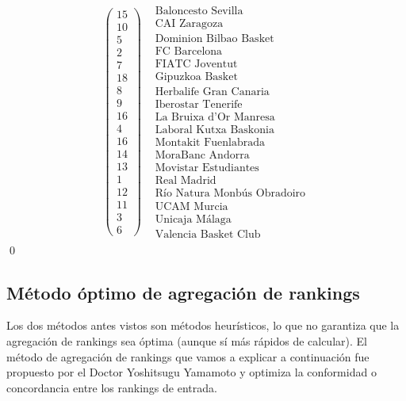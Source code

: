 \[
\begin{array}{cc}
\left(\begin{array}{c}
15\\
10\\
5\\
2\\
7\\
18\\
8\\
9\\
16\\
4\\
16\\
14\\
13\\
1\\
12\\
11\\
3\\
6
\end{array} \right) & \begin{array}{c}
\text{Baloncesto Sevilla}\\
\text{CAI Zaragoza} \\
\text{Dominion Bilbao Basket} \\
\text{FC Barcelona} \\
\text{FIATC Joventut} \\
\text{Gipuzkoa Basket} \\
\text{Herbalife Gran Canaria} \\
\text{Iberostar Tenerife} \\
\text{La Bruixa d'Or Manresa} \\
\text{Laboral Kutxa Baskonia} \\
\text{Montakit Fuenlabrada} \\
\text{MoraBanc Andorra} \\
\text{Movistar Estudiantes} \\
\text{Real Madrid} \\
\text{Río Natura Monbús Obradoiro} \\
\text{UCAM Murcia} \\
\text{Unicaja Málaga} \\
\text{Valencia Basket Club}
\end{array} 
\end{array} 
\]
\qed


\subsection{Método óptimo de agregación de rankings}
Los dos métodos antes vistos son métodos heurísticos, lo que no garantiza que la agregación de rankings sea óptima (aunque sí más rápidos de calcular). El método de agregación de rankings que vamos a explicar a continuación fue propuesto por el Doctor Yoshitsugu Yamamoto y optimiza la conformidad o concordancia entre los rankings de entrada.\\

